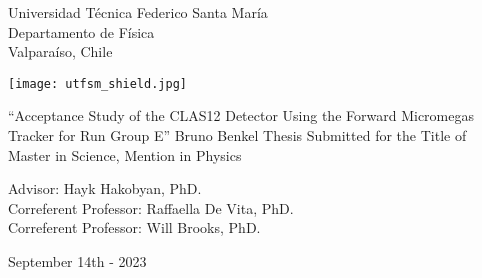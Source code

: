 \begin{titlepage}
\begin{center}
    \noindent
    \fontsize{18pt}{22pt}\selectfont Universidad T\'ecnica Federico Santa Mar\'ia \\
    \fontsize{16pt}{19pt}\selectfont Departamento de F\'isica \\
    \fontsize{16pt}{19pt}\selectfont Valpara\'iso, Chile \\
    \vspace{1.5cm}

    \texttt{[image: utfsm\_shield.jpg]}
    \vspace{1.5cm}

    \fontsize{20pt}{24pt}\selectfont ``Acceptance Study of the CLAS12 Detector Using the Forward Micromegas Tracker for Run Group E''
    \vfill
    \fontsize{16pt}{19pt}\selectfont Bruno Benkel
    \vfill
    \fontsize{16pt}{19pt}\selectfont Thesis Submitted for the Title of \\ Master in Science, Mention in Physics
    \vspace{1.5cm}

    \fontsize{14pt}{17pt}\selectfont Advisor: Hayk Hakobyan, PhD. \\
    \fontsize{14pt}{17pt}\selectfont Correferent Professor: Raffaella De Vita, PhD. \\
    \fontsize{14pt}{17pt}\selectfont Correferent Professor: Will Brooks, PhD.
    \vspace{2.5cm}

    \fontsize{14pt}{17pt}\selectfont September 14th - 2023
\end{center}
\end{titlepage}

       \pagebreak
 \pagebreak
         \pagebreak
         \pagebreak
\tableofcontents                         \pagebreak
{} {}
\listoffigures                           \pagebreak
